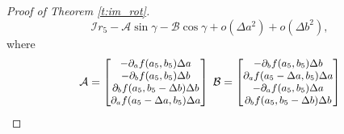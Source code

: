 \documentclass[10pt,journal,compsoc]{IEEEtran}
\begin{document}
\begin{proof}[Proof of Theorem \ref{t:im_rot}]
\begin{equation}
		\mathcal{I}  r_5 - \mathcal{A} \sin \gamma
		- \mathcal{B} \cos \gamma
		+ o(\Delta a^2) + o(\Delta b^2),
		\label{eq:points_r}
		\end{equation}
		\noindent
		where
		\begin{equation}
		\small
		\mathcal{A} =
		\begin{bmatrix}
		- \partial_a f(a_5, b_5)\Delta a \\
		- \partial_b f(a_5, b_5)\Delta b \\
		\partial_b f (a_5, b_5-\Delta b)\Delta b \\
		\partial_a f (a_5-\Delta a, b_5)\Delta a \\
		\end{bmatrix}\;
		\mathcal{B} =
		\begin{bmatrix}
		- \partial_b f (a_5, b_5)\Delta b \\
		\partial_a f(a_5-\Delta a, b_5)\Delta a \\
		- \partial_a f (a_5, b_5)\Delta a \\
		\partial_b f (a_5, b_5-\Delta b)\Delta b \\
		\end{bmatrix}
		\label{eq:points_r_notations}
		\end{equation}

\end{proof}
\end{document}
